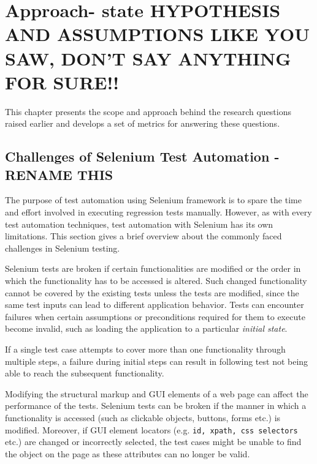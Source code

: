 \chapter{Approach- state HYPOTHESIS AND ASSUMPTIONS LIKE YOU SAW, DON'T SAY ANYTHING FOR SURE!!  } %
\label{Chapter3} %


This chapter presents the scope and approach behind the research questions raised earlier and develops a set of metrics for answering these questions.

\section{Challenges of Selenium Test Automation - RENAME THIS}
\label{challengesSelenium}
The purpose of test automation using Selenium framework is to spare the time and effort involved in executing regression tests manually. However, as with every test automation techniques, test automation with Selenium has its own limitations. This section gives a brief overview about the commonly faced challenges in Selenium testing.

Selenium tests are broken if certain functionalities are modified or the order in which the functionality has to be accessed is altered.
Such changed functionality cannot be covered by the existing tests unless the tests are modified, since the same test inputs can lead to different application behavior. Tests can encounter failures when certain assumptions or preconditions required for them to execute become invalid, such as loading the application to a particular \textit{initial state}.

If a single test case attempts to cover more than one functionality through multiple steps, a failure during initial steps can result in following test not being able to reach the subsequent functionality.

Modifying the structural markup and GUI elements of a web page can affect the performance of the tests. Selenium tests can be broken if the manner in which a functionality is accessed (such as clickable objects, buttons, forms etc.) is modified. Moreover, if GUI element locators (e.g. \texttt{id, xpath, css selectors} etc.) are changed or incorrectly selected, the test cases might be unable to find the object on the page as these attributes can no longer be valid.

